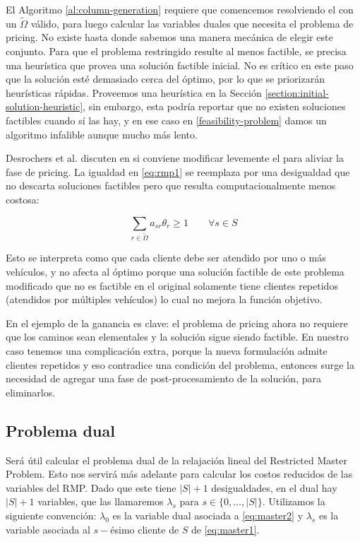 El Algoritmo \ref{al:column-generation} requiere que comencemos resolviendo el  con un $\tilde{\Omega}$ válido, para luego calcular las variables duales que necesita el problema de pricing. No existe hasta donde sabemos una manera mecánica de elegir este conjunto. Para que el problema restringido resulte al menos factible, se precisa una heurística que provea una solución factible inicial. No es crítico en este paso que la solución esté demasiado cerca del óptimo, por lo que se priorizarán heurísticas rápidas. Proveemos una heurística en la Sección \ref{section:initial-solution-heuristic}, sin embargo, esta podría reportar que no existen soluciones factibles cuando sí las hay, y en ese caso en \ref{feasibility-problem} damos un algoritmo infalible aunque mucho más lento.

Desrochers et al. discuten en \cite{desrochers1992} si conviene modificar levemente el  para aliviar la fase de pricing. La igualdad en \ref{eq:rmp1} se reemplaza por una desigualdad que no descarta soluciones factibles pero que resulta computacionalmente menos costosa:

\begin{equation}
\label{eq:ge-restriction-rmp}
     \sum_{r \in \tilde{\Omega}} {a_{sr}\theta_r} \geq 1
\qquad \forall {s \in S}
\end{equation}

Esto se interpreta como que cada cliente debe ser atendido por uno o más vehículos, y no afecta al óptimo porque una solución factible de este problema modificado que no es factible en el original solamente tiene clientes repetidos (atendidos por múltiples vehículos) lo cual no mejora la función objetivo. 

En el ejemplo de \cite{desrochers1992} la ganancia es clave: el problema de pricing ahora no requiere que los caminos sean elementales y la solución sigue siendo factible. En nuestro caso tenemos una complicación extra, porque la nueva formulación admite clientes repetidos y eso contradice una condición del problema, entonces surge la necesidad de agregar una fase de post-procesamiento de la solución, para eliminarlos.


\subsection{Problema dual}

Será útil calcular el problema dual de la relajación lineal del Restricted Master Problem. Esto nos servirá más adelante para calcular los costos reducidos de las variables del RMP. 
Dado que este tiene $|S| + 1$ desigualdades, en el dual hay $|S| + 1$ variables, que las llamaremos $\lambda_s$ para $s \in \{0, \dots, |S|\}$. Utilizamos la siguiente convención: $\lambda_0$ es la variable dual asociada a \ref{eq:master2} y $\lambda_{s}$ es la variable asociada al $s-$ésimo cliente de $S$ de \ref{eq:master1}.
\\

